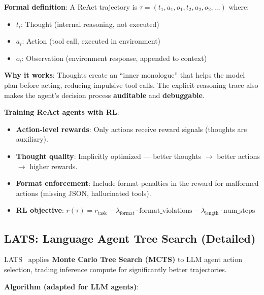 \textbf{Formal definition}: A ReAct trajectory is $\tau = (t_1, a_1, o_1, t_2, a_2, o_2, \ldots)$ where:

\begin{itemize}
  \item $t_i$: Thought (internal reasoning, not executed)
  \item $a_i$: Action (tool call, executed in environment)
  \item $o_i$: Observation (environment response, appended to context)
\end{itemize}

\textbf{Why it works}: Thoughts create an ``inner monologue'' that helps the model plan before acting, reducing impulsive tool calls. The explicit reasoning trace also makes the agent’s decision process \textbf{auditable} and \textbf{debuggable}.

\textbf{Training ReAct agents with RL}:

\begin{itemize}
  \item \textbf{Action-level rewards}: Only actions receive reward signals (thoughts are auxiliary).
  \item \textbf{Thought quality}: Implicitly optimized --- better thoughts $\rightarrow$ better actions $\rightarrow$ higher rewards.
  \item \textbf{Format enforcement}: Include format penalties in the reward for malformed actions (missing JSON, hallucinated tools).
  \item \textbf{RL objective}: $r(\tau) = r_{\text{task}} - \lambda_{\text{format}} \cdot \text{format\_violations} - \lambda_{\text{length}} \cdot \text{num\_steps}$
\end{itemize}

\subsection{LATS: Language Agent Tree Search (Detailed)}
\label{lats-language-agent-tree-search-detailed}

LATS~\cite{zhou2024lats} applies \textbf{Monte Carlo Tree Search (MCTS)} to LLM agent action selection, trading inference compute for significantly better trajectories.

\textbf{Algorithm (adapted for LLM agents)}:

